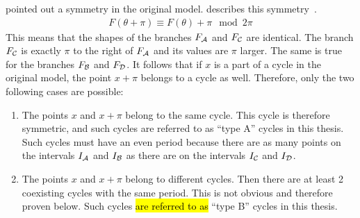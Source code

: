  pointed out a symmetry in the original model.
 describes this symmetry~\cite{akyuz2022}.
\begin{align}
	F(\theta + \pi) \equiv F(\theta) + \pi \mod 2\pi \label{equ:state.og.sym}
\end{align}
This means that the shapes of the branches $F_{\mathcal{A}}$ and $F_{\mathcal{C}}$ are identical.
The branch $F_{\mathcal{C}}$ is exactly $\pi$ to the right of $F_{\mathcal{A}}$ and its values are $\pi$ larger.
The same is true for the branches $F_{\mathcal{B}}$ and $F_{\mathcal{D}}$.
It follows that if $x$ is a part of a cycle in the original model, the point $x + \pi$ belongs to a cycle as well.
Therefore, only the two following cases are possible:

\begin{enumerate}[label=(\Alph*)]
	\item The points $x$ and $x + \pi$ belong to the same cycle.
	      This cycle is therefore symmetric, and such cycles are referred to as ``type A'' cycles in this thesis.
	      Such cycles must have an even period because there are as many points on the intervals $I_{\mathcal{A}}$ and $I_{\mathcal{B}}$ as there are on the intervals $I_{\mathcal{C}}$ and $I_{\mathcal{D}}$.
	\item The points $x$ and $x + \pi$ belong to different cycles.
	      Then there are at least 2 coexisting cycles with the same period.
	      This is not obvious and therefore proven below.
	      Such cycles \hl {are referred to as} ``type B'' cycles in this thesis.
\end{enumerate}

\clearpage


